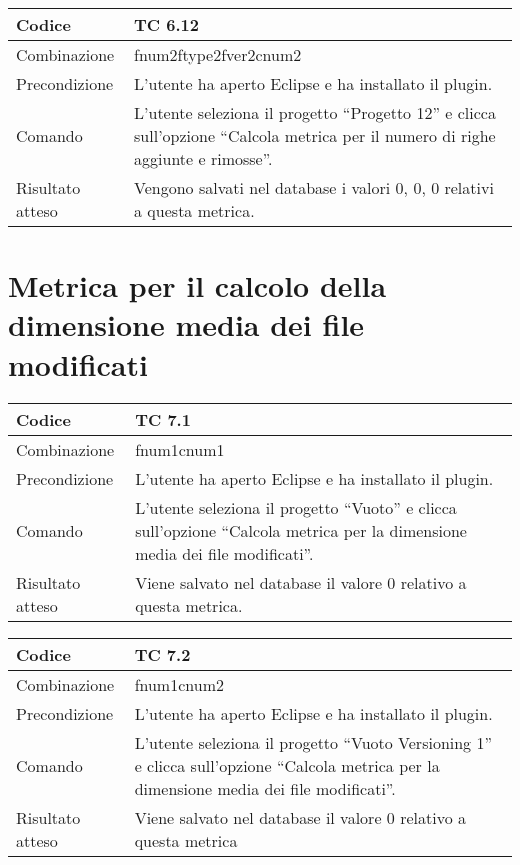 \begin{table}[ht]
\begin{tabular}{|p{3cm}|p{9cm}|}
\hline
\cellcolor{lightgray}Codice				& TC 6.12								\\
\hline
\cellcolor{lightgray}Combinazione		& fnum2ftype2fver2cnum2								\\
\hline
\cellcolor{lightgray}Precondizione		& L'utente ha aperto Eclipse e ha installato il plugin.			\\
\hline
\cellcolor{lightgray}Comando			& L'utente seleziona il progetto ``Progetto 12''  e clicca sull'opzione ``Calcola metrica per il numero di righe aggiunte e rimosse''.	\\
\hline
\cellcolor{lightgray}Risultato atteso	& Vengono salvati nel database i valori 0, 0, 0 relativi a questa metrica.\\
\hline
\end{tabular}
\end{table}

\clearpage

\section{Metrica per il calcolo della dimensione media dei file modificati}

\begin{table}[ht]
\begin{tabular}{|p{3cm}|p{9cm}|}
\hline
\cellcolor{lightgray}Codice				& TC 7.1								\\
\hline
\cellcolor{lightgray}Combinazione		& fnum1cnum1									\\
\hline
\cellcolor{lightgray}Precondizione		& L'utente ha aperto Eclipse e ha installato il plugin.		\\
\hline
\cellcolor{lightgray}Comando			& L'utente seleziona il progetto ``Vuoto''  e clicca sull'opzione ``Calcola metrica per la dimensione media dei file modificati''.	\\
\hline
\cellcolor{lightgray}Risultato atteso	& Viene salvato nel database il valore 0 relativo a questa metrica.\\
\hline
\end{tabular}
\end{table}

\begin{table}[ht]
\begin{tabular}{|p{3cm}|p{9cm}|}
\hline
\cellcolor{lightgray}Codice				& TC 7.2								\\
\hline
\cellcolor{lightgray}Combinazione		& fnum1cnum2 									\\
\hline
\cellcolor{lightgray}Precondizione		& L'utente ha aperto Eclipse e ha installato il plugin.				\\
\hline
\cellcolor{lightgray}Comando			& L'utente seleziona il progetto ``Vuoto Versioning 1''  e clicca sull'opzione ``Calcola metrica per la dimensione media dei file modificati''.	\\
\hline
\cellcolor{lightgray}Risultato atteso	& Viene salvato nel database il valore 0 relativo a questa metrica	\\
\hline
\end{tabular}
\end{table}

